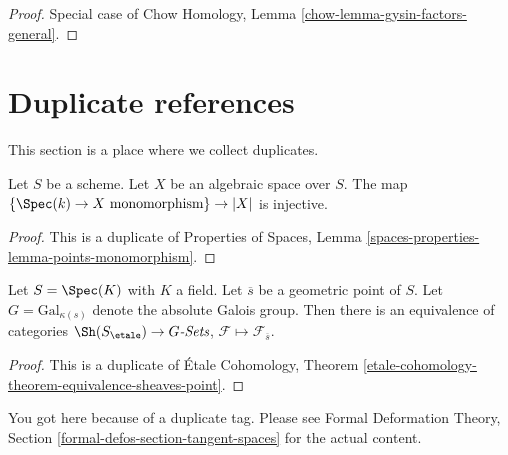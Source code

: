 \begin{proof}
Special case of Chow Homology, Lemma \ref{chow-lemma-gysin-factors-general}.
\end{proof}






\section{Duplicate references}
\label{section-duplicates}

\noindent
This section is a place where we collect duplicates.

\begin{lemma}
\label{lemma-points-monomorphism}
Let $S$ be a scheme. Let $X$ be an algebraic space over $S$.
The map $\{\Spec(k) \to X \text{ monomorphism}\} \to |X|$ is injective.
\end{lemma}

\begin{proof}
This is a duplicate of
Properties of Spaces, Lemma \ref{spaces-properties-lemma-points-monomorphism}.
\end{proof}

\begin{theorem}
\label{theorem-equivalence-sheaves-point}
Let $S = \Spec(K)$ with $K$ a field.
Let $\overline{s}$ be a geometric point of $S$.
Let $G = \text{Gal}_{\kappa(s)}$ denote the absolute Galois group.
Then there is an equivalence of categories
$\Sh(S_\etale) \to G\textit{-Sets}$,
$\mathcal{F} \mapsto \mathcal{F}_{\overline{s}}$.
\end{theorem}

\begin{proof}
This is a duplicate of \'Etale Cohomology, Theorem
\ref{etale-cohomology-theorem-equivalence-sheaves-point}.
\end{proof}

\begin{remark}
\label{remark-tangent-spaces}
You got here because of a duplicate tag. Please see
Formal Deformation Theory, Section \ref{formal-defos-section-tangent-spaces}
for the actual content.
\end{remark}














